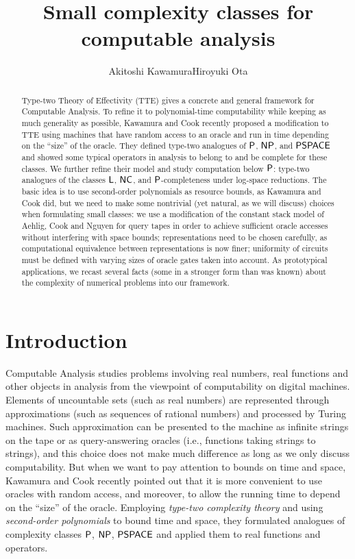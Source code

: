 \documentclass[envcountsame,orivec,oribibl]{llncs}
\title{Small complexity classes for computable analysis}
\author{Akitoshi Kawamura\qquad\qquad Hiroyuki Ota}
\institute{University of Tokyo}
\begin{document}
\maketitle

\begin{abstract}
Type-two Theory of Effectivity (TTE) gives a concrete and general framework for 
Computable Analysis. 
To refine it to polynomial-time computability 
while keeping as much generality as possible, 
Kawamura and Cook recently proposed a modification to TTE using 
machines that have random access to an oracle and 
run in time depending on the ``size'' of the oracle. 
They defined type-two analogues of 
$\mathsf{P}$, $\mathsf{NP}$, and $\mathsf{PSPACE}$ 
and showed some typical operators in analysis
to belong to and be complete for these classes. 
We further refine their model and study computation below $\mathsf{P}$: 
type-two analogues of 
the classes $\mathsf{L}$, 
$\mathsf{NC}$, 
and $\mathsf{P}$-completeness under log-space reductions.
The basic idea is 
to use second-order polynomials as resource bounds, 
as Kawamura and Cook did, 
but we need to make some nontrivial (yet natural, as we will discuss) choices
when formulating small classes: 
we use a modification of the constant stack model 
of Aehlig, Cook and Nguyen for query tapes 
in order to achieve 
sufficient oracle accesses without interfering with space bounds; 
representations need to be chosen carefully, as 
computational equivalence between representations is now finer; 
uniformity of circuits must be defined 
with varying sizes of oracle gates taken into account. 
As prototypical applications, 
we recast several facts (some in a stronger form than was known) 
about the complexity of numerical problems 
into our framework. 
\end{abstract}

\section{Introduction}

Computable Analysis 
\cite{ko1991complexity,weihrauch00:_comput_analy}
studies problems 
involving real numbers, real functions and other objects in analysis
from the viewpoint of computability on digital machines. 
Elements of uncountable sets (such as real numbers) are
represented through approximations (such as sequences of rational numbers)
and processed by Turing machines. 
Such approximation can be 
presented to the machine 
as infinite strings on the tape 
or as query-answering oracles (i.e., functions taking strings to strings), 
and this choice does not make much difference 
as long as we only discuss computability. 
But when we want to pay attention to bounds on time and space, 
Kawamura and Cook \cite{kawamura2012complexity} recently pointed out that 
it is more convenient to use oracles with random access, 
and moreover, to allow the running time 
to depend on the ``size'' of the oracle. 
Employing \emph{type-two complexity theory} and 
using \emph{second-order polynomials} to bound time and space, 
they formulated analogues of complexity classes 
$\mathsf{P}$, $\mathsf{NP}$, $\mathsf{PSPACE}$ and 
applied them to real functions and operators. 
\end{document}
